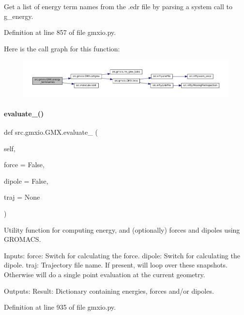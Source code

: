 Get a list of energy term names from the .edr file by parsing a system call to g\+\_\+energy. 



Definition at line 857 of file gmxio.\+py.

Here is the call graph for this function\+:
\nopagebreak
\begin{figure}[H]
\begin{center}
\leavevmode
\includegraphics[width=350pt]{classsrc_1_1gmxio_1_1GMX_aa2907fefccf0791846d2bc87f38ef5fe_cgraph}
\end{center}
\end{figure}
\mbox{\label{classsrc_1_1gmxio_1_1GMX_aece1608d0fc0b3a2a121edb09ac30f75}} 
\paragraph{\texorpdfstring{evaluate\+\_\+()}{evaluate\_()}}
{\footnotesize\ttfamily def src.\+gmxio.\+G\+M\+X.\+evaluate\+\_\+ (\begin{DoxyParamCaption}\item[{}]{self,  }\item[{}]{force = {\ttfamily False},  }\item[{}]{dipole = {\ttfamily False},  }\item[{}]{traj = {\ttfamily None} }\end{DoxyParamCaption})}



Utility function for computing energy, and (optionally) forces and dipoles using G\+R\+O\+M\+A\+CS. 

Inputs\+: force\+: Switch for calculating the force. dipole\+: Switch for calculating the dipole. traj\+: Trajectory file name. If present, will loop over these snapshots. Otherwise will do a single point evaluation at the current geometry.

Outputs\+: Result\+: Dictionary containing energies, forces and/or dipoles. 

Definition at line 935 of file gmxio.\+py.

